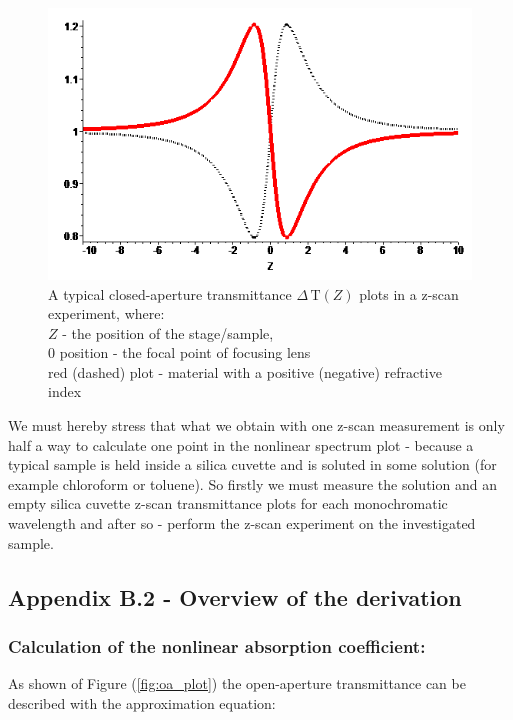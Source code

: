 \documentclass[12pt,twoside,a4paper]{article}
\numberwithin{equation}{subsection}
\numberwithin{figure}{subsection}
\begin{document}
\begin{figure}
  \includegraphics{img/ca_plot.png}
  \caption{A typical closed-aperture transmittance $\Delta \,\mathrm{T}(Z)$ plots in a z-scan experiment, where: \\  
    $Z$ - the position of the stage/sample, \\
    $0$ position - the focal point of focusing lens \\
    red (dashed) plot - material with a positive (negative) refractive index
    \label{fig:ca_plot}}
\end{figure}

We must hereby stress that what we obtain with one z-scan measurement is only half a way to calculate one point in the nonlinear spectrum plot - because a typical sample is held inside a silica cuvette and is soluted in some solution (for example chloroform or toluene). So firstly we must measure the solution and an empty silica cuvette z-scan transmittance plots for each monochromatic wavelength and after so - perform the z-scan experiment on the investigated sample. 

\subsection*{Appendix B.2 - Overview of the derivation} \label{chap:zscan_derivation}

\subsubsection*{Calculation of the nonlinear absorption coefficient:}

As shown of Figure (\ref{fig:oa_plot}) the open-aperture transmittance can be described with the approximation equation:
\end{document}

